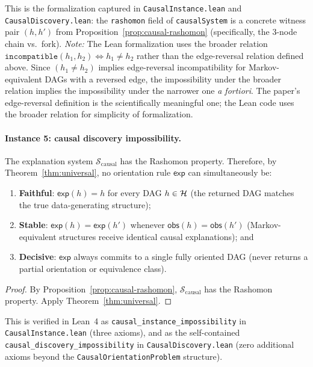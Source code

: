 This is the formalization captured in \texttt{CausalInstance.lean} and
\texttt{CausalDiscovery.lean}: the \texttt{rashomon} field of
\texttt{causalSystem} is a concrete witness pair $(h, h')$ from
Proposition~\ref{prop:causal-rashomon} (specifically, the 3-node chain vs.\
fork).  \emph{Note:} The Lean formalization uses the broader relation
$\texttt{incompatible}(h_1, h_2) \iff h_1 \ne h_2$ rather than the
edge-reversal relation defined above.  Since $(h_1 \ne h_2)$ implies
edge-reversal incompatibility for Markov-equivalent DAGs with a reversed edge,
the impossibility under the broader relation implies the impossibility under
the narrower one \emph{a fortiori}.  The paper's edge-reversal definition is
the scientifically meaningful one; the Lean code uses the broader relation for
simplicity of formalization.

\paragraph{Instance 5: causal discovery impossibility.}

\begin{theorem}
\label{thm:causal-impossibility}
The explanation system $\mathcal{S}_{\mathrm{causal}}$ has the Rashomon
property.  Therefore, by Theorem~\ref{thm:universal}, no orientation rule
$\mathsf{exp}$ can simultaneously be:
\begin{enumerate}
  \item \textbf{Faithful}: $\mathsf{exp}(h) = h$ for every DAG $h \in \mathcal{H}$
    (the returned DAG matches the true data-generating structure);
  \item \textbf{Stable}: $\mathsf{exp}(h) = \mathsf{exp}(h')$ whenever
    $\mathsf{obs}(h) = \mathsf{obs}(h')$ (Markov-equivalent structures
    receive identical causal explanations); and
  \item \textbf{Decisive}: $\mathsf{exp}$ always commits to a single fully
    oriented DAG (never returns a partial orientation or equivalence class).
\end{enumerate}
\end{theorem}

\begin{proof}
By Proposition~\ref{prop:causal-rashomon}, $\mathcal{S}_{\mathrm{causal}}$
has the Rashomon property.  Apply Theorem~\ref{thm:universal}.
\end{proof}

{\raggedright
This is verified in Lean~4 as
\texttt{causal\_instance\_impossibility} in
\texttt{CausalInstance.lean} (three axioms), and as the
self-contained \texttt{causal\_discovery\_impossibility}
in \texttt{CausalDiscovery.lean} (zero additional axioms
beyond the \texttt{CausalOrientationProblem} structure).\par}

